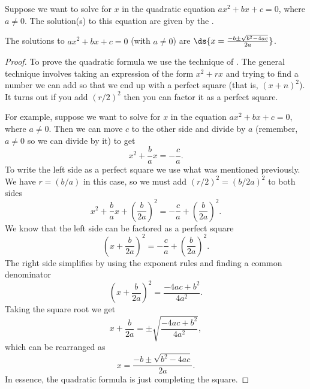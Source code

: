 Suppose we want to solve for $x$ in the quadratic
equation $ax^2+bx+c=0$, where $a\neq 0$.
The solution(s) to this equation are given by the .\\

\begin{formulabox}
The solutions to $ax^2+bx+c=0$ (with $a\neq 0$) are $\ds{x=\frac{-b\pm\sqrt{b^2-4ac}}{2a}}$.
\end{formulabox}

\begin{proof}
To prove the quadratic formula we use the technique of . The general technique involves taking an expression of the 
form $x^2+rx$ and trying to find a number we can add so that we end up 
with a perfect square (that is, $(x+n)^2$). It turns out if you add $(r/2)^2$ 
then you can factor it as a perfect square.

For example, suppose we want to solve for $x$ in the equation $ax^2+bx+c=0$, where $a\neq 0$.
Then we can move $c$ to the other side and divide by $a$ (remember, $a\neq 0$ so we can divide by it) to get
$$x^2+\frac{b}{a}x=-\frac{c}{a}.$$
To write the left side as a perfect square we use what was mentioned previously.
We have $r=(b/a)$ in this case, so we must add $(r/2)^2=(b/2a)^2$ to both sides
$$x^2+\frac{b}{a}x+\left(\frac{b}{2a}\right)^2=-\frac{c}{a}+\left(\frac{b}{2a}\right)^2.$$
We know that the left side can be factored as a perfect square
$$\left(x+\frac{b}{2a}\right)^2=-\frac{c}{a}+\left(\frac{b}{2a}\right)^2.$$
The right side simplifies by using the exponent rules and finding a common denominator
$$\left(x+\frac{b}{2a}\right)^2=\frac{-4ac+b^2}{4a^2}.$$
Taking the square root we get
$$x+\frac{b}{2a}=\pm\sqrt{\frac{-4ac+b^2}{4a^2}},$$
which can be rearranged as
$$x=\frac{-b\pm\sqrt{b^2-4ac}}{2a}.$$
In essence, the quadratic formula is just completing the square.
\end{proof}